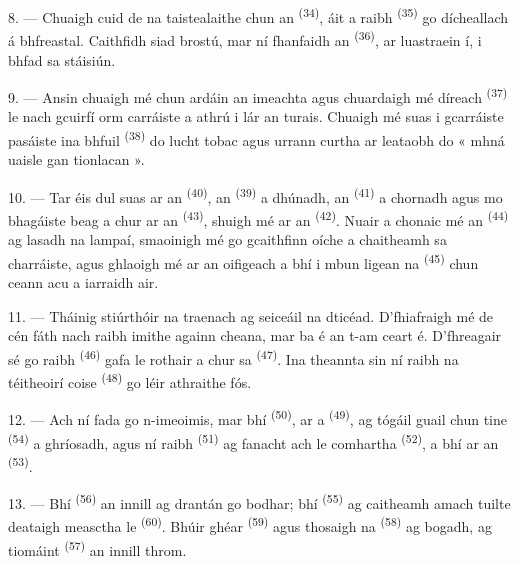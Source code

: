 8. --- Chuaigh cuid de na taistealaithe chun an 
\textsuperscript{(34)}, áit a raibh  \textsuperscript{(35)} go
dícheallach á bhfreastal. Caithfidh siad brostú, mar ní fhanfaidh an 
\textsuperscript{(36)}, ar luastraein í, i bhfad sa stáisiún.

9. --- Ansin chuaigh mé chun ardáin an imeachta agus chuardaigh mé 
díreach \textsuperscript{(37)} le nach gcuirfí orm carráiste a athrú i lár an turais.
Chuaigh mé suas i gcarráiste pasáiste ina bhfuil 
\textsuperscript{(38)} do lucht tobac agus urrann curtha ar leataobh do « mhná
uaisle gan tionlacan ».

\VUsaut{3.0mm}

10. --- Tar éis dul suas ar an  \textsuperscript{(40)}, an
 \textsuperscript{(39)} a dhúnadh, an 
\textsuperscript{(41)} a chornadh agus mo bhagáiste beag a chur ar an
 \textsuperscript{(43)}, shuigh mé ar an 
\textsuperscript{(42)}. Nuair a chonaic mé an 
\textsuperscript{(44)} ag lasadh na lampaí, smaoinigh mé go gcaithfinn oíche a
chaitheamh sa charráiste, agus ghlaoigh mé ar an oifigeach a bhí i mbun ligean na
 \textsuperscript{(45)} chun ceann acu a iarraidh air.

11. --- Tháinig stiúrthóir na traenach ag seiceáil na dticéad. D'fhiafraigh mé de cén
fáth nach raibh imithe againn cheana, mar ba é an t-am ceart é. D'fhreagair sé go
raibh  \textsuperscript{(46)} gafa le rothair a chur sa
 \textsuperscript{(47)}. Ina theannta sin ní raibh na téitheoirí coise
\textsuperscript{(48)} go léir athraithe fós.

12. --- Ach ní fada go n-imeoimis, mar bhí 
\textsuperscript{(50)}, ar a  \textsuperscript{(49)}, ag tógáil
guail chun tine  \textsuperscript{(54)} a ghríosadh, agus ní raibh
 \textsuperscript{(51)} ag fanacht ach le comhartha
 \textsuperscript{(52)}, a bhí ar an 
\textsuperscript{(53)}.

13. --- Bhí  \textsuperscript{(56)} an innill ag drantán go bodhar;
bhí  \textsuperscript{(55)} ag caitheamh amach tuilte deataigh
measctha le  \textsuperscript{(60)}. Bhúir  ghéar
\textsuperscript{(59)} agus thosaigh na  \textsuperscript{(58)} ag
bogadh, ag tiomáint  \textsuperscript{(57)} an innill throm.

